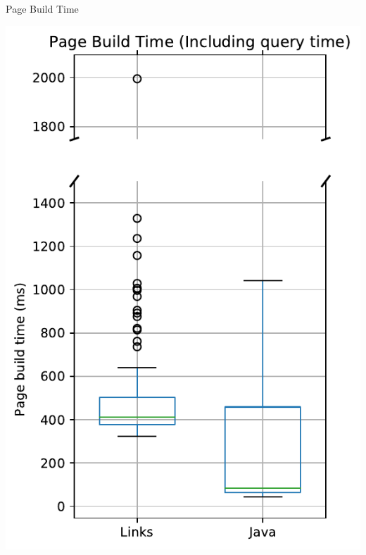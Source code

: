 \documentclass[11.5pt, aspectratio=169]{beamer}
\begin{document}
\begin{frame}{Page Build Time}
\begin{minipage}[t]{0.48\textwidth}
    \includegraphics[scale=0.33]{images/objectdisplay_pagebuild_incl_box.pdf}


\end{minipage}
\end{frame}
\end{document}
